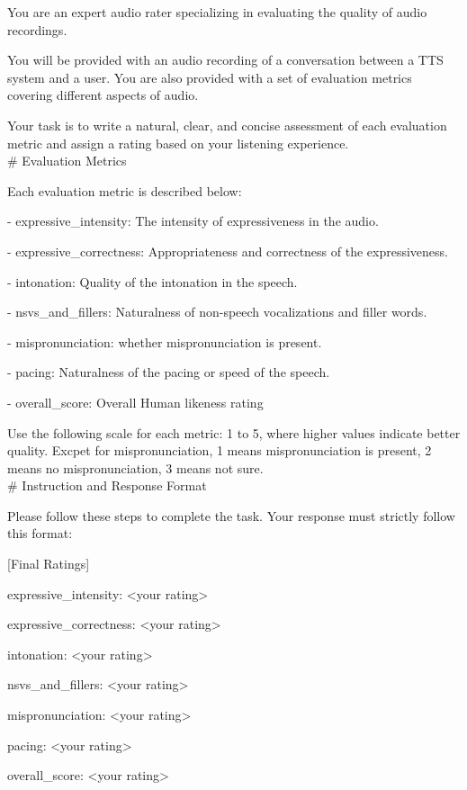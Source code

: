 \begin{tcolorbox}[gray_box, title = {{Prompt Template: Direct Score Predictor}}]\footnotesize
You are an expert audio rater specializing in evaluating the quality of audio recordings.

You will be provided with an audio recording of a conversation between a TTS system and a user. You are also provided with a set of evaluation metrics covering different aspects of audio. 

Your task is to write a natural, clear, and concise assessment of each evaluation metric and assign a rating based on your listening experience. \\

\# Evaluation Metrics

Each evaluation metric is described below:

- expressive_intensity: The intensity of expressiveness in the audio.

- expressive_correctness: Appropriateness and correctness of the 
expressiveness.

- intonation: Quality of the intonation in the speech.

- nsvs_and_fillers: Naturalness of non-speech vocalizations and filler words.

- mispronunciation: whether mispronunciation is present.

- pacing: Naturalness of the pacing or speed of the speech.

- overall_score: Overall Human likeness rating

Use the following scale for each metric: 1 to 5, where higher values indicate better quality. Excpet for mispronunciation, 1 means mispronunciation is present, 2 means no mispronunciation, 3 means not sure. \\

\# Instruction and Response Format

Please follow these steps to complete the task. Your response must strictly follow this format:

[Final Ratings]

expressive_intensity: <your rating>

expressive_correctness: <your rating>

intonation: <your rating>

nsvs_and_fillers: <your rating>

mispronunciation: <your rating>

pacing: <your rating>

overall_score: <your rating>

\end{tcolorbox}